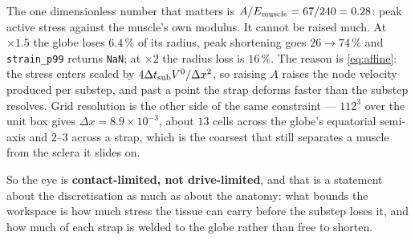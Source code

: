 \documentclass[10pt]{article}
\begin{document}
The one dimensionless number that matters is $A/E_{\rm muscle} = 67/240 = 0.28$: peak active
stress against the muscle's own modulus. It cannot be raised much. At $\times1.5$ the globe
loses $6.4\,\%$ of its radius, peak shortening goes $26\to74\,\%$ and \texttt{strain\_p99}
returns \texttt{NaN}; at $\times2$ the radius loss is $16\,\%$. The reason is
\eqref{eq:affine}: the stress enters scaled by $4\Delta t_{\rm sub}V^0/\Delta x^{2}$, so
raising $A$ raises the node velocity produced per substep, and past a point the strap
deforms faster than the substep resolves. Grid resolution is the other side of the same
constraint --- $112^3$ over the unit box gives $\Delta x = 8.9\times10^{-3}$, about $13$
cells across the globe's equatorial semi-axis and $2$--$3$ across a strap, which is the
coarsest that still separates a muscle from the sclera it slides on.

So the eye is \textbf{contact-limited, not drive-limited}, and that is a statement about the
discretisation as much as about the anatomy: what bounds the workspace is how much stress
the tissue can carry before the substep loses it, and how much of each strap is welded to
the globe rather than free to shorten.
\end{document}
